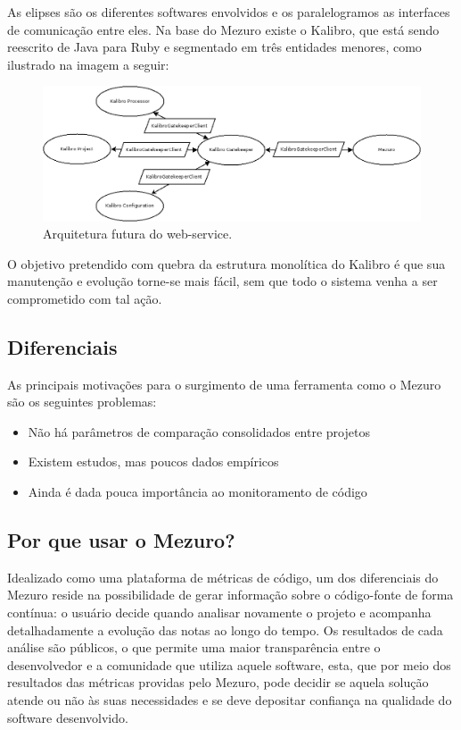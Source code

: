 \documentclass[12pt]{article}
\begin{document}
  As elipses são os diferentes softwares envolvidos e os paralelogramos as interfaces de comunicação entre eles. Na base do Mezuro existe o Kalibro, que está sendo reescrito
  de Java para Ruby e segmentado em três entidades menores, como ilustrado na imagem a seguir:
  \begin{figure}[H]
    \centering
      \includegraphics[scale=0.30]{images/mezuro-architecture-predicted.png}
    \caption{Arquitetura futura do web-service.}
    \label{fig:architecture-1}
  \end{figure}

  O objetivo pretendido com quebra da estrutura monolítica do Kalibro é que sua manutenção e evolução torne-se mais fácil, sem que todo o sistema venha a ser comprometido com tal ação.
  \subsection{Diferenciais} \label{subsec:motivacao}
  As principais motivações para o surgimento de uma ferramenta como o Mezuro são os seguintes problemas:
  \begin{itemize}
      \item Não há parâmetros de comparação consolidados entre projetos
      \item Existem estudos, mas poucos dados empíricos
      \item Ainda é dada pouca importância ao monitoramento de código
  \end{itemize}

  \subsection{Por que usar o Mezuro?} \label{sec:projeto-mezuro}
  Idealizado como uma plataforma de métricas de código, um dos diferenciais do Mezuro reside na possibilidade de gerar informação sobre o código-fonte de forma contínua: o usuário decide quando analisar novamente o projeto e acompanha detalhadamente a evolução das notas ao longo do tempo. Os resultados de cada análise são públicos, o que permite uma maior transparência entre o desenvolvedor e a comunidade que utiliza aquele software, esta, que por meio dos resultados das métricas providas pelo Mezuro, pode decidir se aquela solução atende ou não às suas necessidades e se deve depositar confiança na qualidade do software desenvolvido.
\end{document}
